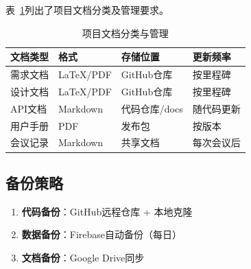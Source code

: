 表~\ref{tab:doc_types}列出了项目文档分类及管理要求。

\begin{table}[htbp]
    \centering
    \caption{项目文档分类与管理}
    \label{tab:doc_types}
    \begin{tabular}{llll}
        \toprule
        \textbf{文档类型} & \textbf{格式} & \textbf{存储位置} & \textbf{更新频率} \\
        \midrule
        需求文档          & LaTeX/PDF   & GitHub仓库      & 按里程碑          \\
        设计文档          & LaTeX/PDF   & GitHub仓库      & 按里程碑          \\
        API文档         & Markdown    & 代码仓库/docs     & 随代码更新         \\
        用户手册          & PDF         & 发布包           & 按版本           \\
        会议记录          & Markdown    & 共享文档          & 每次会议后         \\
        \bottomrule
    \end{tabular}
\end{table}

\subsection{备份策略}

\begin{enumerate}
    \item \textbf{代码备份}：GitHub远程仓库 + 本地克隆
    \item \textbf{数据备份}：Firebase自动备份（每日）
    \item \textbf{文档备份}：Google Drive同步
\end{enumerate}